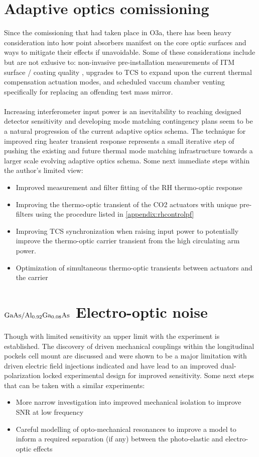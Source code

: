 
\section{Adaptive optics comissioning}
Since the comissioning that had taken place in O3a, there has been heavy consideration into how point absorbers manifest on the core optic surfaces and ways to mitigate their effects if unavoidable. Some of these considerations include but are not exlusive to: non-invasive pre-installation measurements of ITM surface / coating quality \cite{dcc:paNSFupdate2022}, upgrades to TCS to expand upon the current thermal compensation actuation modes, and scheduled vaccum chamber venting specifically for replacing an offending test mass mirror. 
\\
\\
Increasing interferometer input power is an inevitability to reaching designed detector sensitivity and developing mode matching contingency plans seem to be a natural progression of the current adaptive optics schema. The technique for improved ring heater transient response represents a small iterative step of pushing the existing and future thermal mode matching infrastructure towards a larger scale evolving adaptive optics schema. Some next immediate steps within the author's limited view:

\begin{itemize}
	\item Improved measurement and filter fitting of the RH thermo-optic response
	\item Improving the thermo-optic transient of the CO2 actuators with unique pre-filters using the procedure listed in \autoref{appendix:rhcontrolpf} 
	\item Improving TCS synchronization when raising input power to potentially improve the thermo-optic carrier transient from the high circulating arm power.
	\item Optimization of simultaneous thermo-optic transients between actuators and the carrier 
\end{itemize}

\section{\texorpdfstring{$\mathrm{GaAs} / \mathrm{Al_{0.92}Ga_{0.08}As}$}{gaas/algaas} Electro-optic noise}
Though with limited sensitivity an upper limit with the experiment is established. The discovery of driven mechanical couplings within the longitudinal pockels cell mount are discussed and were shown to be a major limitation with driven electric field injections indicated and have lead to an improved dual-polarization locked experimental design for improved sensitivity. Some next steps that can be taken with a similar experiments:

\begin{itemize}
	\item More narrow investigation into improved mechanical isolation to improve SNR at low frequency
	\item Careful modelling of opto-mechanical resonances to improve a model to inform a required separation (if any) between the photo-elastic and electro-optic effects 
\end{itemize}
